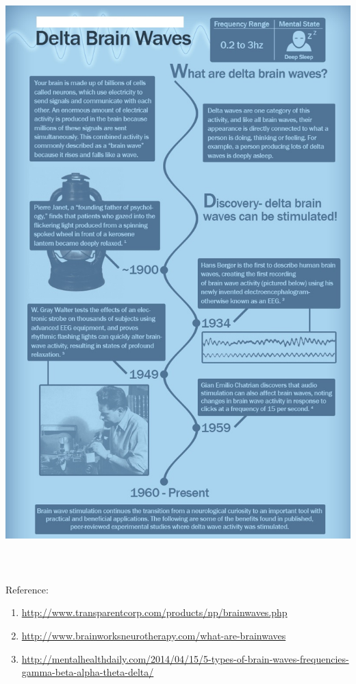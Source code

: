 \documentclass[10pt]{article}
\begin{document}
\begin{center}
	\graphicspath{ {images/} }
	\includegraphics[width=16cm, height=23cm]{Delta_waves}
\end{center}

{\raggedright
{\large Reference:}
}

\begin{enumerate}
	\item {\large
\href{http://www.transparentcorp.com/products/np/brainwaves.php}{http://www.transparentcorp.com/products/np/brainwaves.php}}
	\item {\large
\href{http://www.brainworksneurotherapy.com/what-are-brainwaves}{http://www.brainworksneurotherapy.com/what-are-brainwaves}}
	\item {\large
\href{http://mentalhealthdaily.com/2014/04/15/5-types-of-brain-waves-frequencies-gamma-beta-alpha-theta-delta/}{http://mentalhealthdaily.com/2014/04/15/5-types-of-brain-waves-frequencies-gamma-beta-alpha-theta-delta/}}
\end{enumerate}
\end{document}
